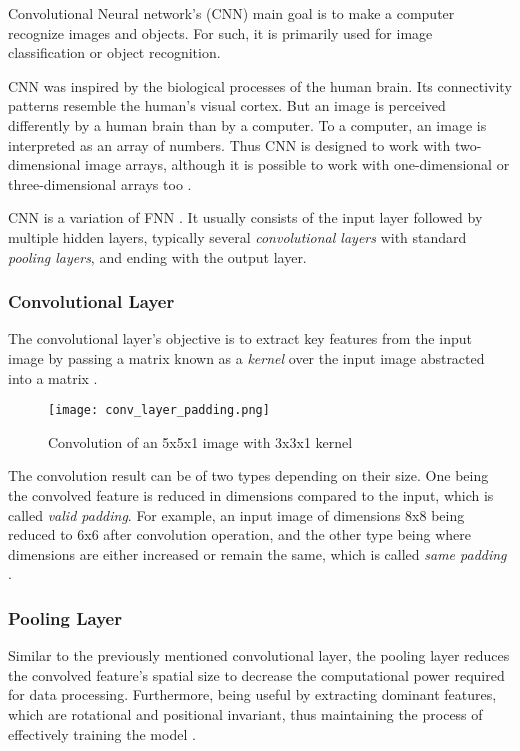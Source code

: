 Convolutional Neural network's (CNN) main goal is to make a computer recognize images and objects. For such, it is primarily used for image classification or object recognition.

CNN was inspired by the biological processes of the human brain. Its connectivity patterns resemble the human's visual cortex. But an image is perceived differently by a human brain than by a computer. To a computer, an image is interpreted as an array of numbers. Thus CNN is designed to work with two-dimensional image arrays, although it is possible to work with one-dimensional or three-dimensional arrays too \cite{mlmastery}.

CNN is a variation of FNN \cite{Goodfellow-et-al-2016}. It usually consists of the input layer followed by multiple hidden layers, typically several \textit{convolutional layers} with standard \textit{pooling layers}, and ending with the output layer. 

\subsubsection{Convolutional Layer}

The convolutional layer's objective is to extract key features from the input image by passing a matrix known as a \textit{kernel} over the input image abstracted into a matrix \cite{mathworkscnn}.

\begin{figure}[h]
	\centering
    \texttt{[image: conv\_layer\_padding.png]}
	\caption{Convolution of an 5x5x1 image with 3x3x1 kernel \cite{compguideCnn}}
	\label{fig:cnn_conv}
\end{figure}


The convolution result can be of two types depending on their size. One being the convolved feature is reduced in dimensions compared to the input, which is called \textit{valid padding}. For example, an input image of dimensions 8x8 being reduced to 6x6 after convolution operation, and the other type being where dimensions are either increased or remain the same, which is called \textit{same padding} \cite{compguideCnn}.

\subsubsection{Pooling Layer}


Similar to the previously mentioned convolutional layer, the pooling layer reduces the convolved feature's spatial size to decrease the computational power required for data processing. Furthermore, being useful by extracting dominant features, which are rotational and positional invariant, thus maintaining the process of effectively training the model \cite{compguideCnn}.

